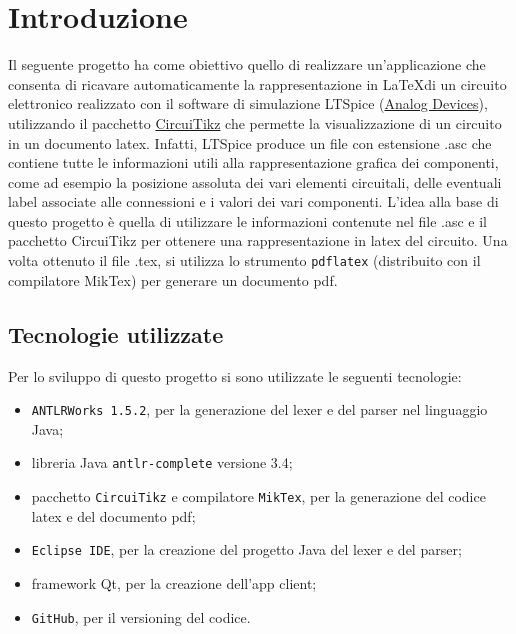 \section{Introduzione}
Il seguente progetto ha come obiettivo quello di realizzare un'applicazione che consenta di ricavare automaticamente la rappresentazione in \LaTeX \;di un circuito elettronico realizzato con il software di simulazione LTSpice (\href{https://www.analog.com/en/design-center/design-tools-and-calculators/ltspice-simulator.html}{Analog Devices}), utilizzando il pacchetto \href{https://it.overleaf.com/learn/latex/CircuiTikz_package}{CircuiTikz} che permette la visualizzazione di un circuito in un documento latex. Infatti, LTSpice produce un file con estensione .asc che contiene tutte le informazioni utili alla rappresentazione grafica dei componenti, come ad esempio la posizione assoluta dei vari elementi circuitali, delle eventuali label associate alle connessioni e i valori dei vari componenti. L'idea alla base di questo progetto è quella di utilizzare le informazioni contenute nel file .asc e il pacchetto CircuiTikz per ottenere una rappresentazione in latex del circuito. Una volta ottenuto il file .tex, si utilizza lo strumento \texttt{pdflatex} (distribuito con il compilatore MikTex) per generare un documento pdf.
\subsection{Tecnologie utilizzate}
Per lo sviluppo di questo progetto si sono utilizzate le seguenti tecnologie:
\begin{itemize}
	\item \texttt{ANTLRWorks 1.5.2}, per la generazione del lexer e del parser nel linguaggio Java;
	\item libreria Java \texttt{antlr-complete} versione 3.4;
	\item pacchetto \texttt{CircuiTikz} e compilatore \texttt{MikTex}, per la generazione del codice latex e del documento pdf;
	\item \texttt{Eclipse IDE}, per la creazione del progetto Java del lexer e del parser;
	\item framework Qt, per la creazione dell'app client;
	\item \texttt{GitHub}, per il versioning del codice.
\end{itemize}
